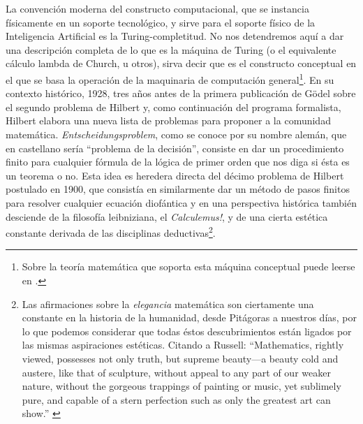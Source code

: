 \documentclass[12pt]{memoir}
\begin{document}
La convención moderna del constructo computacional, que se instancia físicamente en un soporte tecnológico, y sirve para el soporte físico de la Inteligencia Artificial es la Turing-completitud. No nos detendremos aquí a dar una descripción completa de lo que es la máquina de Turing (o el equivalente cálculo lambda de Church, u otros), sirva decir que es el constructo conceptual en el que se basa la operación de la maquinaria de computación general\footnote{Sobre la teoría matemática que soporta esta máquina conceptual puede leerse en \parencite{automata, turingComputableNumbers}.}. En su contexto histórico, 1928, tres años antes de la primera publicación de Gödel sobre el segundo problema de Hilbert y, como continuación del programa formalista, Hilbert elabora una nueva lista de problemas para proponer a la comunidad matemática. \textit{Entscheidungsproblem}, como se conoce por su nombre alemán, que en castellano sería ``problema de la decisión'', consiste en dar un procedimiento finito para cualquier fórmula de la lógica de primer orden que nos diga si ésta es un teorema o no. Esta idea es heredera directa del décimo problema de Hilbert postulado en 1900, que consistía en similarmente dar un método de pasos finitos para resolver cualquier ecuación diofántica y en una perspectiva histórica también desciende de la filosofía leibniziana, el \textit{Calculemus!}, y de una cierta estética constante derivada de las disciplinas deductivas\footnote{Las afirmaciones sobre la \textit{elegancia} matemática son ciertamente una constante en la historia de la humanidad, desde Pitágoras a nuestros días, por lo que podemos considerar que todas éstos descubrimientos están ligados por las mismas aspiraciones estéticas. Citando a Russell: ``Mathematics, rightly viewed, possesses not only truth, but supreme beauty—a beauty cold and austere, like that of sculpture, without appeal to any part of our weaker nature, without the gorgeous trappings of painting or music, yet sublimely pure, and capable of a stern perfection such as only the greatest art can show.'' \parencite[p.61]{russell1919mysticism}}.
\end{document}
